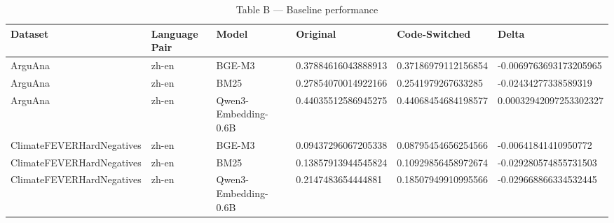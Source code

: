\begin{table}[ht]
\centering
\caption{Table B — Baseline performance}
\begin{tabular}{llllll}
\hline
Dataset & Language Pair & Model & Original & Code-Switched & Delta \\
\hline
ArguAna & zh-en & BGE-M3 & 0.37884616043888913 & 0.37186979112156854 & -0.0069763693173205965 \\
ArguAna & zh-en & BM25 & 0.27854070014922166 & 0.2541979267633285 & -0.02434277338589319 \\
ArguAna & zh-en & Qwen3-Embedding-0.6B & 0.44035512586945275 & 0.44068454684198577 & 0.00032942097253302327 \\
ClimateFEVERHardNegatives & zh-en & BGE-M3 & 0.09437296067205338 & 0.08795454656254566 & -0.00641841410950772 \\
ClimateFEVERHardNegatives & zh-en & BM25 & 0.13857913944545824 & 0.10929856458972674 & -0.029280574855731503 \\
ClimateFEVERHardNegatives & zh-en & Qwen3-Embedding-0.6B & 0.2147483654444881 & 0.18507949910995566 & -0.029668866334532445 \\
\hline
\end{tabular}
\end{table}
